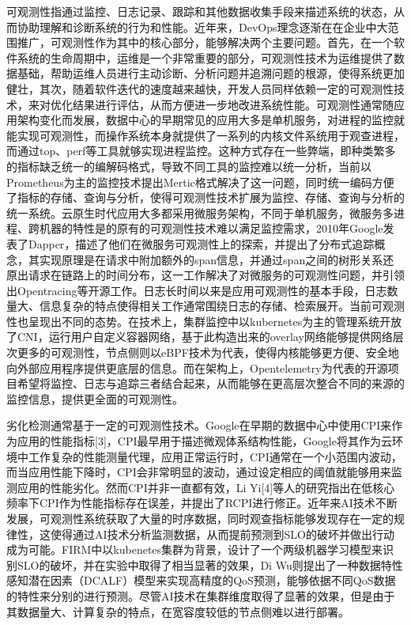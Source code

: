 可观测性指通过监控、日志记录、跟踪和其他数据收集手段来描述系统的状态，从而协助理解和诊断系统的行为和性能。近年来，DevOps理念逐渐在在企业中大范围推广，可观测性作为其中的核心部分，能够解决两个主要问题。首先，在一个软件系统的生命周期中，运维是一个非常重要的部分，可观测性技术为运维提供了数据基础，帮助运维人员进行主动诊断、分析问题并追溯问题的根源，使得系统更加健壮，其次，随着软件迭代的速度越来越快，开发人员同样依赖一定的可观测性技术，来对优化结果进行评估，从而方便进一步地改进系统性能。可观测性通常随应用架构变化而发展，数据中心的早期常见的应用大多是单机服务，对进程的监控就能实现可观测性，而操作系统本身就提供了一系列的内核文件系统用于观查进程，而通过top、perf等工具就够实现进程监控。这种方式存在一些弊端，即种类繁多的指标缺乏统一的编解码格式，导致不同工具的监控难以统一分析，当前以Prometheus为主的监控技术提出Mertic格式解决了这一问题，同时统一编码方便了指标的存储、查询与分析，使得可观测性技术扩展为监控、存储、查询与分析的统一系统。云原生时代应用大多都采用微服务架构，不同于单机服务，微服务多进程、跨机器的特性是的原有的可观测性技术难以满足监控需求，2010年Google发表了Dapper\citep{sigelman2010dapper}，描述了他们在微服务可观测性上的探索，并提出了分布式追踪概念，其实现原理是在请求中附加额外的span信息，并通过span之间的树形关系还原出请求在链路上的时间分布，这一工作解决了对微服务的可观测性问题，并引领出Opentracing等开源工作。日志长时间以来是应用可观测性的基本手段，日志数量大、信息复杂的特点使得相关工作通常围绕日志的存储、检索展开。当前可观测性也呈现出不同的态势。在技术上，集群监控中以kubernetes为主的管理系统开放了CNI，运行用户自定义容器网络，基于此构造出来的overlay网络能够提供网络层次更多的可观测性，节点侧则以eBPF技术为代表，使得内核能够更方便、安全地向外部应用程序提供更底层的信息。而在架构上，Opentelemetry为代表的开源项目希望将监控、日志与追踪三者结合起来，从而能够在更高层次整合不同的来源的监控信息，提供更全面的可观测性。

劣化检测通常基于一定的可观测性技术。Google在早期的数据中心中使用CPI来作为应用的性能指标[3]，CPI最早用于描述微观体系结构性能，Google将其作为云环境中工作复杂的性能测量代理，应用正常运行时，CPI通常在一个小范围内波动，而当应用性能下降时，CPI会非常明显的波动，通过设定相应的阈值就能够用来监测应用的性能劣化。然而CPI并非一直都有效，Li Yi[4]等人的研究指出在低核心频率下CPI作为性能指标存在误差，并提出了RCPI进行修正。近年来AI技术不断发展，可观测性系统获取了大量的时序数据，同时观查指标能够发现存在一定的规律性，这使得通过AI技术分析监测数据，从而提前预测到SLO的破坏并做出行动成为可能\citep{qiu2020firm, zhou2022aquatope, wang2022deepscaling, gan2021sage}。FIRM\citep{qiu2020firm}中以kubenetes集群为背景，设计了一个两级机器学习模型来识别SLO的破坏，并在实验中取得了相当显著的效果，Di Wu\citep{wu2020data}则提出了一种数据特性感知潜在因素（DCALF）模型来实现高精度的QoS预测，能够依据不同QoS数据的特性来分别的进行预测。尽管AI技术在集群维度取得了显著的效果，但是由于其数据量大、计算复杂的特点，在宽容度较低的节点侧难以进行部署。


